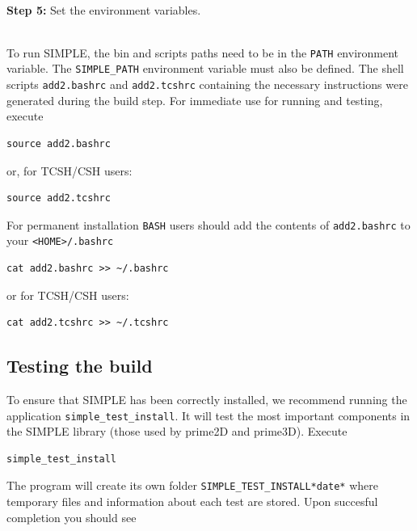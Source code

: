 \documentclass[a4paper,11pt]{article}
\begin{document}
\noindent{}\\\textbf{Step 5:} Set the environment variables.

\noindent{}\\To run SIMPLE, the bin and scripts paths need to be in the \texttt{PATH} environment
variable. The \texttt{SIMPLE\_PATH} environment variable must also be defined. The 
shell scripts \texttt{add2.bashrc} and \texttt{add2.tcshrc} containing the necessary
instructions were generated during the build step. For immediate use for running and testing, execute

\begin{Verbatim}[commandchars=+\[\],fontsize=\small,breaklines=true]
source add2.bashrc
\end{Verbatim}

\noindent{}or, for TCSH/CSH users:

\begin{Verbatim}[commandchars=+\[\],fontsize=\small,breaklines=true]
source add2.tcshrc
\end{Verbatim}

\noindent{}For permanent installation \texttt{BASH} users should add the contents of \texttt{add2.bashrc} to your \texttt{<HOME>/.bashrc}

\begin{Verbatim}[commandchars=+\[\],fontsize=\small,breaklines=true]
cat add2.bashrc >> ~/.bashrc
\end{Verbatim}

\noindent{}or for TCSH/CSH users:

\begin{Verbatim}[commandchars=+\[\],fontsize=\small,breaklines=true]
cat add2.tcshrc >> ~/.tcshrc
\end{Verbatim}

\subsection{Testing the build}

\noindent{}To ensure that SIMPLE has been correctly installed, we recommend running the application \texttt{simple\_test\_install}. It will test the most 
important components in the SIMPLE library  (those used by prime2D and  prime3D). Execute

\begin{Verbatim}[commandchars=+\[\],fontsize=\small,breaklines=true]
simple_test_install 
\end{Verbatim}

\noindent{}The program will create its own folder \texttt{SIMPLE\_TEST\_INSTALL*date*} where temporary files and information about each 
test are stored. Upon succesful completion you should see
\end{document}
